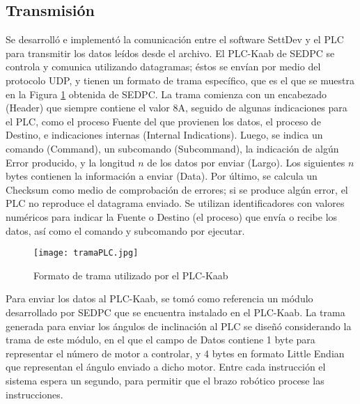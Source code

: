 \subsection{Transmisión}

Se desarrolló e implementó la comunicación entre el software SettDev y el PLC para transmitir los datos leídos desde el archivo. El PLC-Kaab de SEDPC se controla y comunica utilizando datagramas; éstos se envían por medio del protocolo UDP, y tienen un formato de trama específico, que es el que se muestra en la Figura \ref{fig:tramaPLC} obtenida de SEDPC. La trama comienza con un encabezado (Header) que siempre contiene el valor 8A, seguido de algunas indicaciones para el PLC, como el proceso Fuente del que provienen los datos, el proceso de Destino, e indicaciones internas (Internal Indications). Luego, se indica un comando (Command), un subcomando (Subcommand), la indicación de algún Error producido, y la longitud $n$ de los datos por enviar (Largo). Los siguientes $n$ bytes contienen la información a enviar (Data). Por último, se calcula un Checksum como medio de comprobación de errores; si se produce algún error, el PLC no reproduce el datagrama enviado. Se utilizan identificadores con valores numéricos para indicar la Fuente o Destino (el proceso) que envía o recibe los datos, así como el comando y subcomando por ejecutar.

\begin{figure}[htb]
	\centering
	\texttt{[image: tramaPLC.jpg]}
	\caption{Formato de trama utilizado por el PLC-Kaab}
	\label{fig:tramaPLC}
\end{figure}

Para enviar los datos al PLC-Kaab, se tomó como referencia  un módulo desarrollado por SEDPC que se encuentra instalado en el PLC-Kaab. La trama generada para enviar los ángulos de inclinación al PLC se diseñó considerando la trama de este módulo, en el que el campo de Datos contiene 1 byte para representar el número de motor a controlar, y 4 bytes en formato Little Endian que representan el ángulo enviado a dicho motor. Entre cada instrucción el sistema espera un segundo, para permitir que el brazo robótico procese las instrucciones.